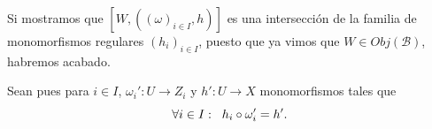 \documentclass[10pt]{article}
\newtheorem[M]{teo}{Teorema}[section]
\newtheorem[M]{listaObj}[teo]{Lista de deseos}
\newtheorem[M]{preg}[teo]{Pregunta}
\newtheorem[M]{lema}[teo]{Lema}
\newtheorem[M]{hip}[teo]{Hipótesis}
\newtheorem[M]{prop}[teo]{Proposición}
\newtheorem[M]{obs}[teo]{Observación}
\newtheorem[M]{cor}[teo]{Corolario}
\newtheorem[M]{notacion}[teo]{Notación}
\newtheorem[M]{nota}[teo]{Nota}
\begin{document}
\begin{center}
\begin{tikzpicture}[x=0.75pt,y=0.75pt,yscale=-1,xscale=1]
\end{tikzpicture}
\end{center}
Si mostramos que $[W, ( (\omega)_{i \in I}, h ) ]$ es una intersección 
de la familia de monomorfismos regulares $(h_{i})_{i \in I}$, puesto que ya
vimos que $W \in Obj(\mathcal{B})$, habremos acabado.

Sean pues para $i \in I$,
$\omega_{i}' : U \longrightarrow Z_{i}$ y
$h' : U \longrightarrow X$ monomorfismos tales que
\begin{equation}
	\label{eq: hi omega i prima = h prima}
\forall i \in I: \hspace{0.2cm} h_{i} \circ \omega_{i}' = h'.
\end{equation}

\begin{center}
\begin{tikzpicture}[x=0.75pt,y=0.75pt,yscale=-1,xscale=1]



\end{tikzpicture}
\end{center}
\end{document}

